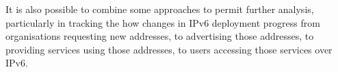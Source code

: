 It is also possible to combine some approaches to permit further analysis,
particularly in tracking the how changes in IPv6 deployment progress from
organisations requesting new addresses, to advertising those addresses, to
providing services using those addresses, to users accessing those
services over IPv6.





